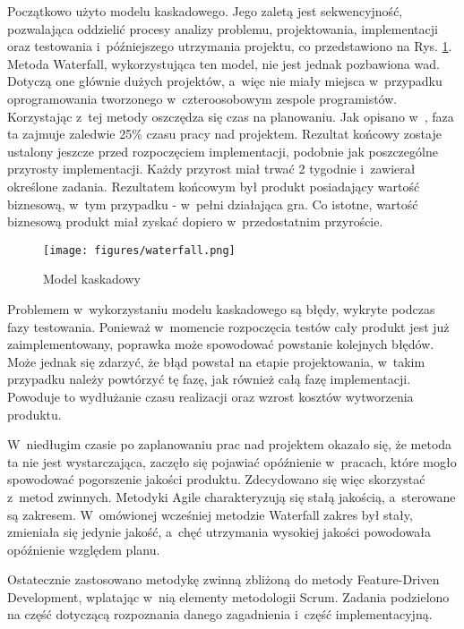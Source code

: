 Początkowo użyto modelu kaskadowego. Jego zaletą jest sekwencyjność, pozwalająca oddzielić procesy analizy problemu, projektowania, implementacji oraz testowania i~późniejszego utrzymania projektu, co przedstawiono na Rys. \ref{waterfall}. Metoda Waterfall, wykorzystująca ten model, nie jest jednak pozbawiona wad. Dotyczą one głównie dużych projektów, a~więc nie miały miejsca w~przypadku oprogramowania tworzonego w~czteroosobowym zespole programistów. Korzystając z~tej metody oszczędza się czas na planowaniu. Jak opisano w~\cite{Kaczor:Scrum}, faza ta zajmuje zaledwie 25\% czasu pracy nad projektem. Rezultat końcowy zostaje ustalony jeszcze przed rozpoczęciem implementacji, podobnie jak poszczególne przyrosty implementacji. Każdy przyrost miał trwać 2 tygodnie i~zawierał określone zadania. Rezultatem końcowym był produkt posiadający wartość biznesową, w~tym przypadku - w~pełni działająca gra. Co istotne, wartość biznesową produkt miał zyskać dopiero w~przedostatnim przyroście. 

\begin{figure}
\begin{center}
\texttt{[image: figures/waterfall.png]}
\caption{Model kaskadowy}
\label{waterfall}
\end{center}
\end{figure}

Problemem w~wykorzystaniu modelu kaskadowego są błędy, wykryte podczas fazy testowania. Ponieważ w~momencie rozpoczęcia testów cały produkt jest już zaimplementowany, poprawka może spowodować powstanie kolejnych błędów. Może jednak się zdarzyć, że błąd powstał na etapie projektowania, w~takim przypadku należy powtórzyć tę fazę, jak również całą fazę implementacji. Powoduje to wydłużanie czasu realizacji oraz wzrost kosztów wytworzenia produktu.

W~niedługim czasie po zaplanowaniu prac nad projektem okazało się, że metoda ta nie jest wystarczająca, zaczęło się pojawiać opóźnienie w~pracach, które mogło spowodować pogorszenie jakości produktu. Zdecydowano się więc skorzystać z~metod zwinnych. Metodyki Agile charakteryzują się stałą jakością, a~sterowane są zakresem. W~omówionej wcześniej metodzie Waterfall zakres był stały, zmieniała się jedynie jakość, a~chęć utrzymania wysokiej jakości powodowała opóźnienie względem planu. 

Ostatecznie zastosowano metodykę zwinną zbliżoną do metody Feature-Driven Development, wplatając w~nią elementy metodologii Scrum. Zadania podzielono na część dotyczącą rozpoznania danego zagadnienia i~część implementacyjną. 

